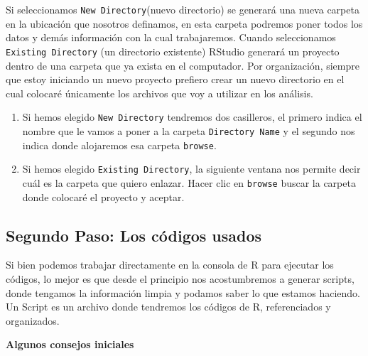 \documentclass[]{article}
\begin{document}
Si seleccionamos \texttt{New\ Directory}(nuevo directorio) se generará
una nueva carpeta en la ubicación que nosotros definamos, en esta
carpeta podremos poner todos los datos y demás información con la cual
trabajaremos. Cuando seleccionamos \texttt{Existing\ Directory} (un
directorio existente) RStudio generará un proyecto dentro de una carpeta
que ya exista en el computador. Por organización, siempre que estoy
iniciando un nuevo proyecto prefiero crear un nuevo directorio en el
cual colocaré únicamente los archivos que voy a utilizar en los
análisis.

\begin{enumerate}
\def\labelenumi{\arabic{enumi}.}
\setcounter{enumi}{3}
\item
  Si hemos elegido \texttt{New\ Directory} tendremos dos casilleros, el
  primero indica el nombre que le vamos a poner a la carpeta
  \texttt{Directory\ Name} y el segundo nos indica donde alojaremos esa
  carpeta \texttt{browse}.
\item
  Si hemos elegido \texttt{Existing\ Directory}, la siguiente ventana
  nos permite decir cuál es la carpeta que quiero enlazar. Hacer clic en
  \texttt{browse} buscar la carpeta donde colocaré el proyecto y
  aceptar.
\end{enumerate}

\subsection{Segundo Paso: Los códigos
usados}\label{segundo-paso-los-codigos-usados}

Si bien podemos trabajar directamente en la consola de R para ejecutar
los códigos, lo mejor es que desde el principio nos acostumbremos a
generar scripts, donde tengamos la información limpia y podamos saber lo
que estamos haciendo. Un Script es un archivo donde tendremos los
códigos de R, referenciados y organizados.

\textbf{Algunos consejos iniciales}
\end{document}
